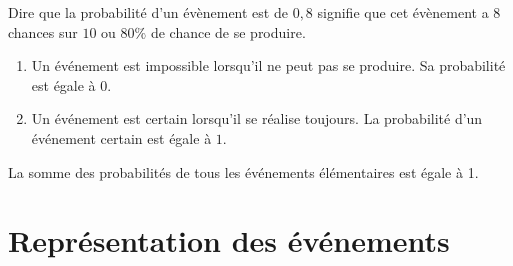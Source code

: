 \documentclass[a4paper,10pt]{report}
\begin{document}
\begin{ex}
Dire que la probabilité d'un évènement est de $0,8$ signifie que cet évènement a $8$ chances sur $10$ ou $80 \%$ de chance de se produire.
\end{ex}

\begin{rem}
\begin{enumerate}
\item[•] Un événement est impossible lorsqu'il ne peut pas se produire. Sa probabilité est égale à $0$.
\item[•] Un événement est certain lorsqu'il se réalise toujours. La probabilité d'un événement certain est égale à $1$.
\end{enumerate}
\end{rem}

\begin{prop}
La somme des probabilités de tous les événements élémentaires est égale à 1.
\end{prop}

\section{Représentation des événements} 
\end{document}
